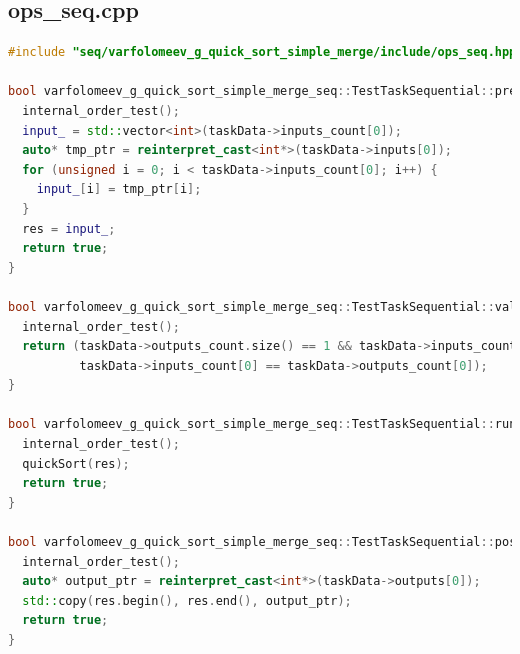 \documentclass[a4paper,12pt]{article}
\begin{document}
\subsection{ops\_seq.cpp}
\begin{lstlisting}[language=C++]
#include "seq/varfolomeev_g_quick_sort_simple_merge/include/ops_seq.hpp"

bool varfolomeev_g_quick_sort_simple_merge_seq::TestTaskSequential::pre_processing() {
  internal_order_test();
  input_ = std::vector<int>(taskData->inputs_count[0]);
  auto* tmp_ptr = reinterpret_cast<int*>(taskData->inputs[0]);
  for (unsigned i = 0; i < taskData->inputs_count[0]; i++) {
    input_[i] = tmp_ptr[i];
  }
  res = input_;
  return true;
}

bool varfolomeev_g_quick_sort_simple_merge_seq::TestTaskSequential::validation() {
  internal_order_test();
  return (taskData->outputs_count.size() == 1 && taskData->inputs_count.size() == 1 && taskData->inputs_count[0] > 0 &&
          taskData->inputs_count[0] == taskData->outputs_count[0]);
}

bool varfolomeev_g_quick_sort_simple_merge_seq::TestTaskSequential::run() {
  internal_order_test();
  quickSort(res);
  return true;
}

bool varfolomeev_g_quick_sort_simple_merge_seq::TestTaskSequential::post_processing() {
  internal_order_test();
  auto* output_ptr = reinterpret_cast<int*>(taskData->outputs[0]);
  std::copy(res.begin(), res.end(), output_ptr);
  return true;
}
\end{lstlisting}
\end{document}
